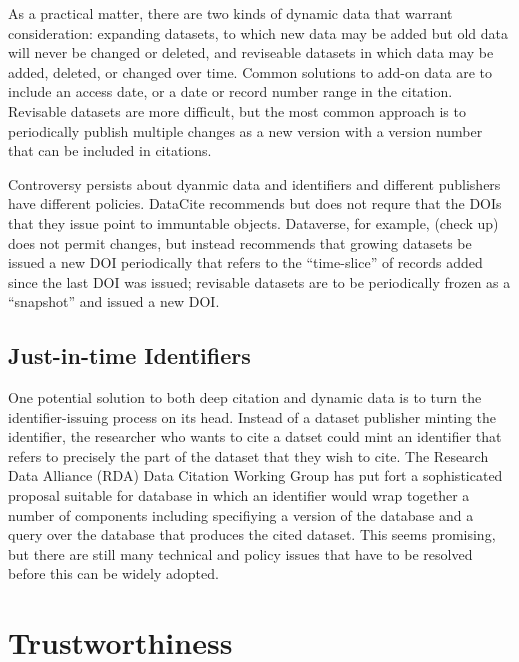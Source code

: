 \documentclass[10pt,a4paper,twocolumn]{article}
\begin{document}
As a practical matter, there are two kinds of dynamic data that warrant consideration: expanding datasets, to which new data may be added but old data will never be changed or deleted, and reviseable datasets in which data may be added, deleted, or changed over time. 
Common solutions to add-on data are to include an access date, or a date or record number range in the citation. 
Revisable datasets are more difficult, but the most common approach is to periodically publish multiple changes as a new version with a version number that can be included in citations.

Controversy persists about dyanmic data and identifiers and different publishers have different policies. 
DataCite recommends but does not requre that the DOIs that they issue point to immuntable objects. 
Dataverse, for example, (check up) does not permit changes, but instead recommends that growing datasets be issued a new DOI periodically that refers to the ``time-slice'' of records added since the last DOI was issued; revisable datasets are to be periodically frozen as a ``snapshot'' and issued a new DOI.

\subsection*{Just-in-time Identifiers}\label{just-in-time-identifiers}

One potential solution to both deep citation and dynamic data is to turn the identifier-issuing process on its head. 
Instead of a dataset publisher minting the identifier, the researcher who wants to cite a datset could mint an identifier that refers to precisely the part of the dataset that they wish to cite. 
The Research Data Alliance (RDA) Data Citation Working Group has put fort a sophisticated proposal suitable for database in which an identifier would wrap together a number of components including specifiying a version of the database and a query over the database that produces the cited dataset. 
This seems promising, but there are still many technical and policy issues that have to be resolved before this can be widely adopted.

\section*{Trustworthiness}\label{trustworthiness}

\end{document}

